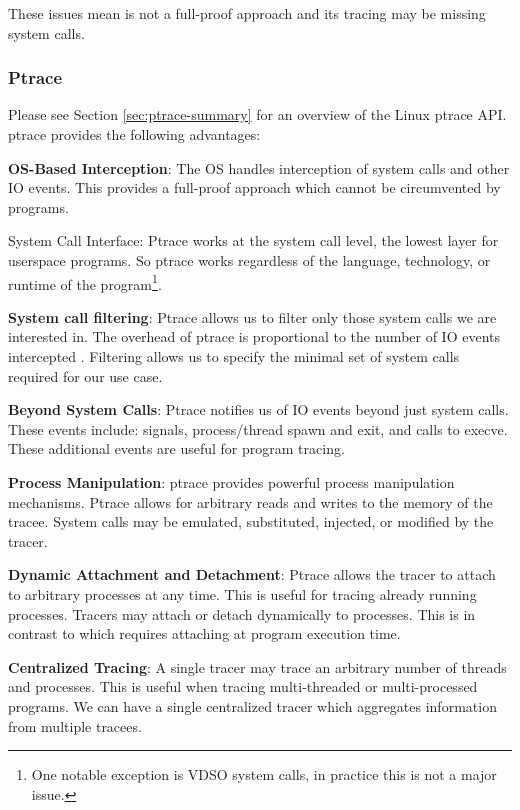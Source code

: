 These issues mean \ldpreload{} is not a full-proof approach and its tracing may be missing system calls.

\subsubsection{Ptrace} \label{sec:ptrace-tradeoffs}
Please see Section \ref{sec:ptrace-summary} for an overview of the Linux ptrace API. ptrace provides the following advantages:
\begin{compactitem}
    \item \textbf{OS-Based Interception}: The OS handles interception of system calls and other IO events. This provides a full-proof approach which cannot be circumvented by programs.
    \item System Call Interface: Ptrace works at the system call level, the lowest layer
    for userspace programs. So ptrace works regardless of the language, technology, or runtime of the program\footnote{One notable exception is VDSO system calls, in practice this is not a major issue.}.
   \item \textbf{System call filtering}: Ptrace allows us to filter only those system calls we are interested in. The overhead of ptrace is proportional to the number of IO events intercepted \cite{dettrace}. Filtering allows us to specify the minimal set of system calls required for our use case. 
    \item \textbf{Beyond System Calls}: Ptrace notifies us of IO events beyond just system calls. These events include: signals, process/thread spawn and exit, and calls to execve. These additional events are useful for program tracing.
    \item \textbf{Process Manipulation}: ptrace provides powerful process manipulation mechanisms. Ptrace allows for arbitrary reads and writes to the memory of the tracee. System calls may be emulated, substituted, injected, or modified by the tracer.
    \item \textbf{Dynamic Attachment and Detachment}: Ptrace allows the tracer to attach to arbitrary processes at any time. This is useful for tracing already running processes. Tracers may attach or detach dynamically to processes. This is in contrast to \ldpreload which requires attaching at program execution time.
    \item \textbf{Centralized Tracing}: A single tracer may trace an arbitrary number of threads and processes. This is useful when tracing multi-threaded or multi-processed programs. We can have a single centralized tracer which aggregates information from multiple tracees.
\end{compactitem}

